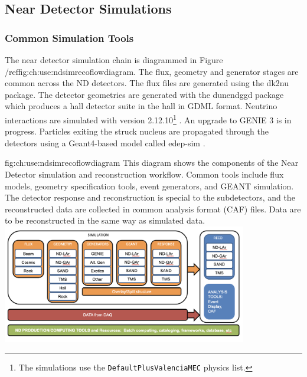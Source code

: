 \documentclass[../main-v1.tex]{subfiles}
\begin{document}
\subsection{Near Detector Simulations}\label{ch:use:nd}


\subsubsection{Common Simulation Tools}

The near detector simulation chain is diagrammed in Figure /ref{fig:ch:use:ndsimrecoflowdiagram}. The flux, geometry and generator stages are common across the ND detectors. The flux files are generated using the dk2nu package. The detector geometries are generated with the dunendggd package which produces a hall detector suite in the hall in GDML format. Neutrino interactions are simulated with  version 2.12.10\footnote{The simulations use the \texttt{DefaultPlusValenciaMEC} physics list.} \cite{Andreopoulos:2009rq}. An upgrade to GENIE 3 is in progress. Particles exiting the struck nucleus are propagated through the detectors using a Geant4-based model called edep-sim \cite{edepsim}.


\begin{dunefigure}
{fig:ch:use:ndsimrecoflowdiagram}
{This diagram shows the components of the Near Detector simulation and reconstruction workflow.  Common tools include flux models, geometry specification tools, event generators, and GEANT simulation.  The detector response and reconstruction is special to the subdetectors, and the reconstructed data are collected in common analysis format (CAF) files.  Data are to be reconstructed in the same way as simulated data.}
\includegraphics[width=0.8\textwidth]{graphics/Algo/ND_sim_reco_flowdiagram.png}
\end{dunefigure}
\end{document}
